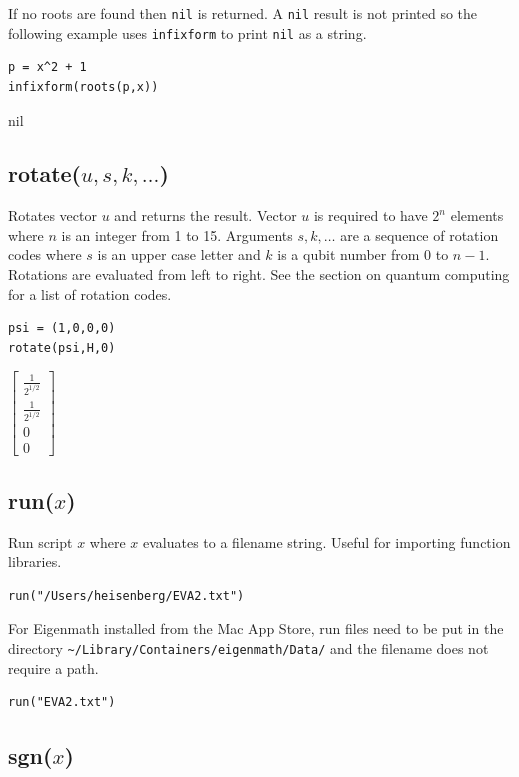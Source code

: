 \documentclass[12pt]{article}
\begin{document}
\bigskip
If no roots are found then \verb$nil$ is returned.
A \verb$nil$ result is not printed so the following example uses
\verb$infixform$ to print \verb$nil$ as a string.

{\color{blue}
\begin{verbatim}
p = x^2 + 1
infixform(roots(p,x))
\end{verbatim}
}

nil

\subsection*{rotate($u,s,k,\ldots$)}
Rotates vector $u$ and returns the result.
Vector $u$ is required to have $2^n$ elements where
$n$ is an integer from 1 to 15.
Arguments $s,k,\ldots$ are a sequence of rotation codes
where $s$ is an upper case letter and $k$ is a qubit number
from 0 to $n-1$.
Rotations are evaluated from left to right.
See the section on quantum computing for a list of rotation codes.

{\color{blue}
\begin{verbatim}
psi = (1,0,0,0)
rotate(psi,H,0)
\end{verbatim}
}

$
\begin{bmatrix}
\frac{1}{2^{1/2}}
\\[1ex]
\frac{1}{2^{1/2}}
\\[1ex]
0
\\[1ex]
0
\end{bmatrix}
$

\subsection*{run($x$)}

Run script $x$ where $x$ evaluates to a filename string.
Useful for importing function libraries.

{\color{blue}
\begin{verbatim}
run("/Users/heisenberg/EVA2.txt")
\end{verbatim}
}

For Eigenmath installed from the Mac App Store,
run files need to be put in the directory
\verb$~/Library/Containers/eigenmath/Data/$
and the filename does not require a path.

{\color{blue}
\begin{verbatim}
run("EVA2.txt")
\end{verbatim}
}

\subsection*{sgn($x$)}
\end{document}
